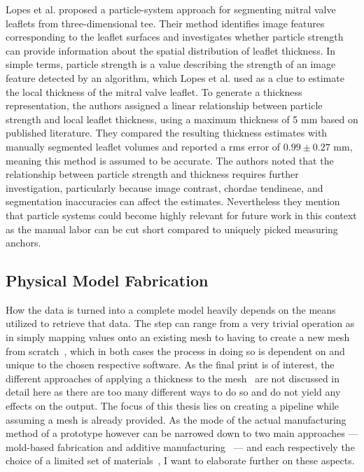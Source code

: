 Lopes et al. \cite{lopes2023using} proposed a particle-system approach for segmenting mitral valve leaflets from three-dimensional \gls{tee}. Their method identifies image features corresponding to the leaflet surfaces and investigates whether particle strength can provide information about the spatial distribution of leaflet thickness. In simple terms, particle strength is a value describing the strength of an image feature detected by an algorithm, which Lopes et al. used as a clue to estimate the local thickness of the mitral valve leaflet. To generate a thickness representation, the authors assigned a linear relationship between particle strength and local leaflet thickness, using a maximum thickness of 5 mm based on published literature. They compared the resulting thickness estimates with manually segmented leaflet volumes and reported a \gls{rms} error of \(0.99 \pm 0.27\) mm, meaning this method is assumed to be accurate. The authors noted that the relationship between particle strength and thickness requires further investigation, particularly because image contrast, chordae tendineae, and segmentation inaccuracies can affect the estimates. Nevertheless they mention that particle systems could become highly relevant for future work in this context as the manual labor can be cut short compared to uniquely picked measuring anchors. 


\subsection{Physical Model Fabrication}\label{subsec:physical_model_fabrication}
How the data is turned into a complete model heavily depends on the means utilized to retrieve that data. The step can range from a very trivial operation as in simply mapping values onto an existing mesh to having to create a new mesh from scratch~\cite{xia2018signal,m2012development,lopes2023using}, which in both cases the process in doing so is dependent on and unique to the chosen respective software. As the final print is of interest, the different approaches of applying a thickness to the mesh~\cite{blenderSolidify,lin2023impact} are not discussed in detail here as there are too many different ways to do so and do not yield any effects on the output. The focus of this thesis lies on creating a pipeline while assuming a mesh is already provided. As the mode of the actual manufacturing method of a prototype however can be narrowed down to two main approaches --- mold-based fabrication and additive manufacturing~\cite{scanlan2018comparison,illi2022translating} --- and each respectively the choice of a limited set of materials~\cite{medellin2019design}, I want to elaborate further on these aspects.

